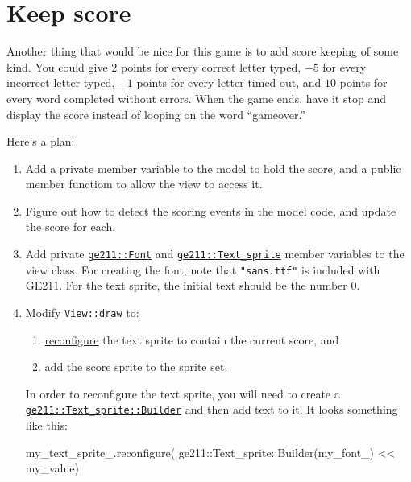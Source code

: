 \documentclass{tufte-handout}
\begin{document}
\section{Keep score}

Another thing that would be nice for this game is to add score keeping
of some kind. You could give $2$ points for every correct letter typed,
$-5$ for every incorrect letter typed, $-1$ points for every letter
timed out, and $10$ points for every word completed without errors. When
the game ends, have it stop and display the score instead of looping on
the word ``gameover.''

Here's a plan:

\begin{enumerate}
  \item Add a private member variable to the model to hold the score,
    and a public member functiom to allow the view to access it.

  \item Figure out how to detect the scoring events in the model code,
    and update the score for each.

  \item Add private
    \href{https://tov.github.io/ge211/classge211_1_1_font.html}{\texttt{ge211::Font}}
    and
    \href{https://tov.github.io/ge211/classge211_1_1sprites_1_1_text__sprite.html}{\texttt{ge211::Text_sprite}}
    member variables to the view class. For creating the font, note that
    \texttt{"sans.ttf"} is included with GE211. For the text sprite, the
    initial text should be the number 0.

  \item Modify \texttt{View::draw} to:
    \begin{enumerate}
      \item
        \href{https://tov.github.io/ge211/classge211_1_1sprites_1_1_text__sprite.html\#afe7c024ae674fec2431b9d3eb9ad4173}{reconfigure}
        the text sprite to contain the current score, and
      \item add the score sprite to the sprite set.
    \end{enumerate}
    In order to reconfigure the text sprite, you will need to create
    a
    \href{https://tov.github.io/ge211/classge211_1_1sprites_1_1_text__sprite_1_1_builder.html}{\texttt{ge211::Text_sprite::Builder}}
    and then add text to it. It looks something like this:
\begin{Code}
my_text_sprite_.reconfigure(
    ge211::Text_sprite::Builder(my_font_) << my_value)
\end{Code}
\end{enumerate}
\end{document}
